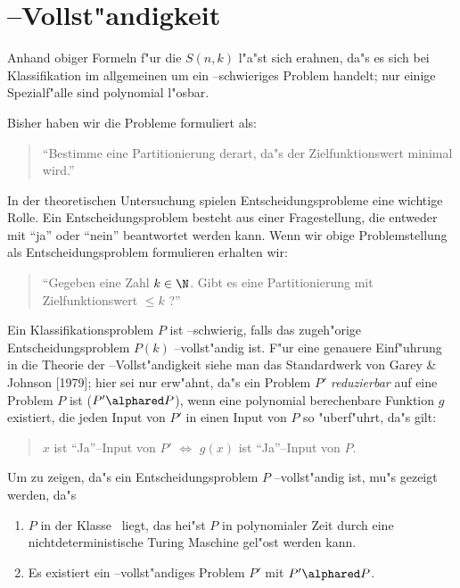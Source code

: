 \section{\NP--Vollst"andigkeit}
\label{npvollstaendigkeit}
Anhand obiger Formeln f"ur die $S(n,k)$ l"a"st sich erahnen, da"s es sich
bei Klassifikation im allgemeinen um ein \NP--schwieriges Problem handelt;
nur einige Spezialf"alle sind polynomial l"osbar.

Bisher haben wir die Probleme formuliert als:
\begin{quote}
	"`Bestimme eine Partitionierung derart, da"s der Zielfunktionswert
	  minimal wird."'
\end{quote}
In der theoretischen Untersuchung spielen Entscheidungsprobleme eine
wichtige Rolle. Ein Entscheidungsproblem besteht aus einer
Fragestellung, die entweder mit "`ja"' oder "`nein"' beantwortet werden
kann. Wenn wir obige Problemstellung als Entscheidungsproblem
formulieren erhalten wir:
\begin{quote}
	"`Gegeben eine Zahl $k \in \N$. Gibt es eine Partitionierung
	  mit Zielfunktionswert $\leq k$ ?"'
\end{quote}
Ein Klassifikationsproblem $P$ ist \NP--schwierig, falls das zugeh"orige
Entscheidungsproblem $P(k)$ \NP--vollst"andig ist.
F"ur eine genauere Einf"uhrung in die Theorie der \NP--Vollst"andigkeit 
siehe man 
das Standardwerk von Garey \& Johnson [1979]; hier sei nur erw"ahnt, da"s ein
Problem $P'$ {\em reduzierbar} auf eine Problem $P$ ist ($P' \alphared P$), 
wenn eine polynomial berechenbare Funktion $g$ existiert, die jeden Input
von $P'$ in einen Input von $P$ so "uberf"uhrt, da"s gilt:
\begin{quote}
	$x$ ist "`Ja"'--Input von $P'$ $\iff$ $g(x)$ ist "`Ja"'--Input von $P$.
\end{quote}

Um zu zeigen, da"s ein Entscheidungsproblem $P$ \NP--vollst"andig ist, 
mu"s gezeigt werden, da"s
\begin{enumerate}
\item $P$ in der Klasse \NP\ liegt, das hei"st 
	$P$ in polynomialer Zeit durch eine nichtdeterministische Turing
	Maschine gel"ost werden kann.
\item Es existiert ein \NP--vollst"andiges Problem $P'$ mit $P' 
	\alphared P$.
\end{enumerate}

